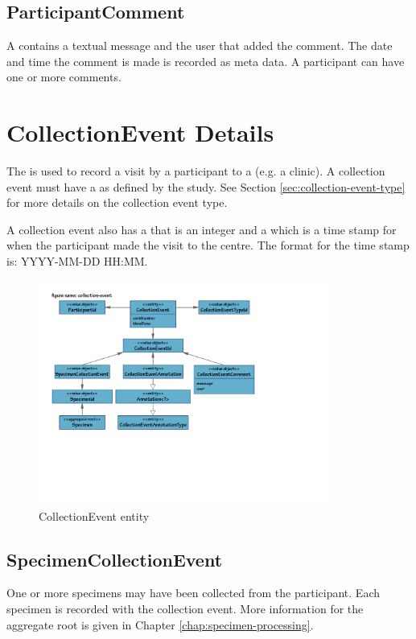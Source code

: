 \subsection*{ParticipantComment}
A  contains a textual message and the user
that added the comment. The date and time the comment is made is recorded as
meta data. A participant can have one or more comments.

\section{CollectionEvent Details}
The  is used to record a visit by a participant
to a  (e.g. a clinic). A collection event must have a
 as defined by the study. See Section
\ref{sec:collection-event-type} for more details on the collection event type.

A collection event also has a  that is an integer and a
 which is a time stamp for when the participant made the
visit to the centre. The format for the time stamp is: YYYY-MM-DD HH:MM.

\begin{figure}[H]
  \centering
  \includegraphics[trim={10mm 72mm 70mm 18mm}, clip,
    width=0.85\textwidth]{images/collection-event}
  \caption{CollectionEvent entity}
  \label{fig:collection-event}
\end{figure}

\subsection*{SpecimenCollectionEvent}
One or more specimens may have been collected from the participant. Each
specimen is recorded with the collection event. More information for the
 aggregate root is given in Chapter
\ref{chap:specimen-processing}.

